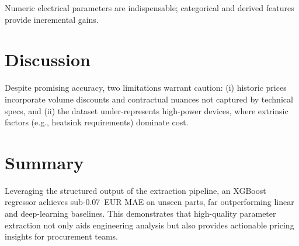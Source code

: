 Numeric electrical parameters are indispensable; categorical and derived features provide incremental gains.

\section{Discussion}
Despite promising accuracy, two limitations warrant caution: (i) historic prices incorporate volume discounts and contractual nuances not captured by technical specs, and (ii) the dataset under-represents high-power devices, where extrinsic factors (e.g., heatsink requirements) dominate cost.

\section{Summary}
Leveraging the structured output of the extraction pipeline, an XGBoost regressor achieves sub-0.07~EUR MAE on unseen parts, far outperforming linear and deep-learning baselines.  This demonstrates that high-quality parameter extraction not only aids engineering analysis but also provides actionable pricing insights for procurement teams.